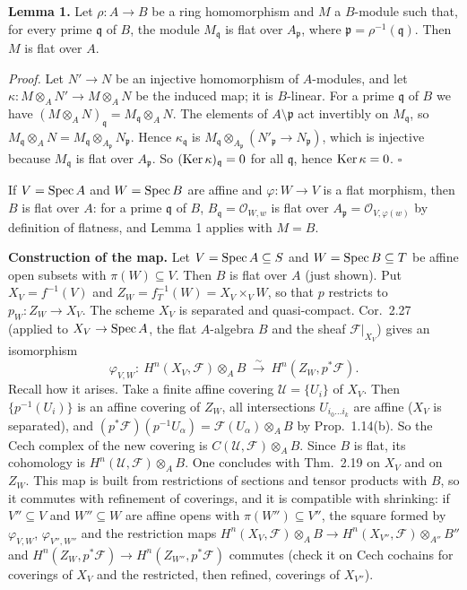 \documentclass[11pt]{article}
\begin{document}
\textbf{Lemma 1.} Let $\rho:A\to B$ be a ring homomorphism and $M$ a $B$-module such that, for every prime $\mathfrak q$ of $B$, the module $M_{\mathfrak q}$ is flat over $A_{\mathfrak p}$, where $\mathfrak p=\rho^{-1}(\mathfrak q)$. Then $M$ is flat over $A$.

\emph{Proof.} Let $N'\to N$ be an injective homomorphism of $A$-modules, and let $\kappa:M\otimes_AN'\to M\otimes_AN$ be the induced map; it is $B$-linear. For a prime $\mathfrak q$ of $B$ we have $(M\otimes_AN)_{\mathfrak q}=M_{\mathfrak q}\otimes_AN$. The elements of $A\setminus\mathfrak p$ act invertibly on $M_{\mathfrak q}$, so $M_{\mathfrak q}\otimes_AN=M_{\mathfrak q}\otimes_{A_{\mathfrak p}}N_{\mathfrak p}$. Hence $\kappa_{\mathfrak q}$ is $M_{\mathfrak q}\otimes_{A_{\mathfrak p}}(N'_{\mathfrak p}\to N_{\mathfrak p})$, which is injective because $M_{\mathfrak q}$ is flat over $A_{\mathfrak p}$. So $(\operatorname{Ker}\kappa)_{\mathfrak q}=0$ for all $\mathfrak q$, hence $\operatorname{Ker}\kappa=0$. \hfill$\square$

If $V=\operatorname{Spec} A$ and $W=\operatorname{Spec} B$ are affine and $\varphi:W\to V$ is a flat morphism, then $B$ is flat over $A$: for a prime $\mathfrak q$ of $B$, $B_{\mathfrak q}=\mathcal O_{W,w}$ is flat over $A_{\mathfrak p}=\mathcal O_{V,\varphi(w)}$ by definition of flatness, and Lemma 1 applies with $M=B$.

\textbf{Construction of the map.} Let $V=\operatorname{Spec} A\subseteq S$ and $W=\operatorname{Spec} B\subseteq T$ be affine open subsets with $\pi(W)\subseteq V$. Then $B$ is flat over $A$ (just shown). Put $X_V=f^{-1}(V)$ and $Z_W=f_T^{-1}(W)=X_V\times_VW$, so that $p$ restricts to $p_W:Z_W\to X_V$. The scheme $X_V$ is separated and quasi-compact. Cor.~2.27 (applied to $X_V\to\operatorname{Spec} A$, the flat $A$-algebra $B$ and the sheaf $\mathcal F|_{X_V}$) gives an isomorphism
\[ \varphi_{V,W}:\ H^n(X_V,\mathcal F)\otimes_AB\ \xrightarrow{\ \sim\ }\ H^n(Z_W,p^*\mathcal F). \]
Recall how it arises. Take a finite affine covering $\mathcal U=\{U_i\}$ of $X_V$. Then $\{p^{-1}(U_i)\}$ is an affine covering of $Z_W$, all intersections $U_{i_0\dots i_k}$ are affine ($X_V$ is separated), and $(p^*\mathcal F)(p^{-1}U_\alpha)=\mathcal F(U_\alpha)\otimes_AB$ by Prop.~1.14(b). So the Cech complex of the new covering is $C(\mathcal U,\mathcal F)\otimes_AB$. Since $B$ is flat, its cohomology is $H^n(\mathcal U,\mathcal F)\otimes_AB$. One concludes with Thm.~2.19 on $X_V$ and on $Z_W$. This map is built from restrictions of sections and tensor products with $B$, so it commutes with refinement of coverings, and it is compatible with shrinking: if $V''\subseteq V$ and $W''\subseteq W$ are affine opens with $\pi(W'')\subseteq V''$, the square formed by $\varphi_{V,W}$, $\varphi_{V'',W''}$ and the restriction maps $H^n(X_V,\mathcal F)\otimes_AB\to H^n(X_{V''},\mathcal F)\otimes_{A''}B''$ and $H^n(Z_W,p^*\mathcal F)\to H^n(Z_{W''},p^*\mathcal F)$ commutes (check it on Cech cochains for coverings of $X_V$ and the restricted, then refined, coverings of $X_{V''}$).
\end{document}
